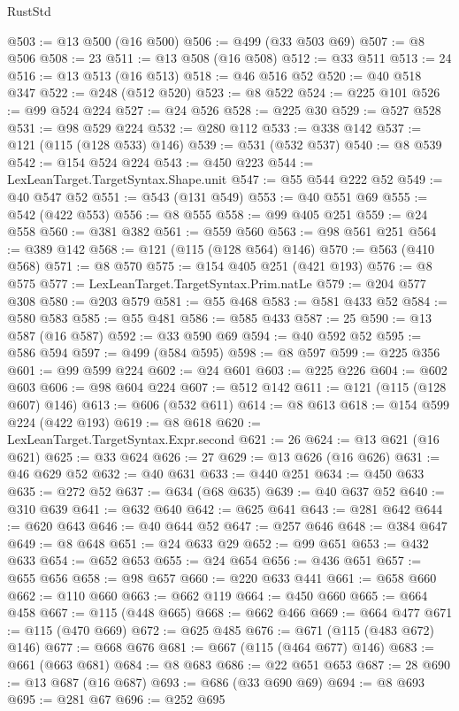 \begin{lexlean}{RustStd}
\begin{coremodule}
{\begin{coremodule}
{{{{{{{{{{{{{{{{{{{{{{{{{{{{{{{{{{{{{{@503 := @13 @500 (@16 @500)
@506 := @499 (@33 @503 @69)
@507 := @8 @506
@508 := 23
@511 := @13 @508 (@16 @508)
@512 := @33 @511
@513 := 24
@516 := @13 @513 (@16 @513)
@518 := @46 @516 @52
@520 := @40 @518 @347
@522 := @248 (@512 @520)
@523 := @8 @522
@524 := @225 @101
@526 := @99 @524 @224
@527 := @24 @526
@528 := @225 @30
@529 := @527 @528
@531 := @98 @529 @224
@532 := @280 @112
@533 := @338 @142
@537 := @121 (@115 (@128 @533) @146)
@539 := @531 (@532 @537)
@540 := @8 @539
@542 := @154 @524 @224
@543 := @450 @223
@544 := LexLeanTarget.TargetSyntax.Shape.unit
@547 := @55 @544 @222 @52
@549 := @40 @547 @52
@551 := @543 (@131 @549)
@553 := @40 @551 @69
@555 := @542 (@422 @553)
@556 := @8 @555
@558 := @99 @405 @251
@559 := @24 @558
@560 := @381 @382
@561 := @559 @560
@563 := @98 @561 @251
@564 := @389 @142
@568 := @121 (@115 (@128 @564) @146)
@570 := @563 (@410 @568)
@571 := @8 @570
@575 := @154 @405 @251 (@421 @193)
@576 := @8 @575
@577 := LexLeanTarget.TargetSyntax.Prim.natLe
@579 := @204 @577 @308
@580 := @203 @579
@581 := @55 @468
@583 := @581 @433 @52
@584 := @580 @583
@585 := @55 @481
@586 := @585 @433
@587 := 25
@590 := @13 @587 (@16 @587)
@592 := @33 @590 @69
@594 := @40 @592 @52
@595 := @586 @594
@597 := @499 (@584 @595)
@598 := @8 @597
@599 := @225 @356
@601 := @99 @599 @224
@602 := @24 @601
@603 := @225 @226
@604 := @602 @603
@606 := @98 @604 @224
@607 := @512 @142
@611 := @121 (@115 (@128 @607) @146)
@613 := @606 (@532 @611)
@614 := @8 @613
@618 := @154 @599 @224 (@422 @193)
@619 := @8 @618
@620 := LexLeanTarget.TargetSyntax.Expr.second
@621 := 26
@624 := @13 @621 (@16 @621)
@625 := @33 @624
@626 := 27
@629 := @13 @626 (@16 @626)
@631 := @46 @629 @52
@632 := @40 @631
@633 := @440 @251
@634 := @450 @633
@635 := @272 @52
@637 := @634 (@68 @635)
@639 := @40 @637 @52
@640 := @310 @639
@641 := @632 @640
@642 := @625 @641
@643 := @281 @642
@644 := @620 @643
@646 := @40 @644 @52
@647 := @257 @646
@648 := @384 @647
@649 := @8 @648
@651 := @24 @633 @29
@652 := @99 @651
@653 := @432 @633
@654 := @652 @653
@655 := @24 @654
@656 := @436 @651
@657 := @655 @656
@658 := @98 @657
@660 := @220 @633 @441
@661 := @658 @660
@662 := @110 @660
@663 := @662 @119
@664 := @450 @660
@665 := @664 @458
@667 := @115 (@448 @665)
@668 := @662 @466
@669 := @664 @477
@671 := @115 (@470 @669)
@672 := @625 @485
@676 := @671 (@115 (@483 @672) @146)
@677 := @668 @676
@681 := @667 (@115 (@464 @677) @146)
@683 := @661 (@663 @681)
@684 := @8 @683
@686 := @22 @651 @653
@687 := 28
@690 := @13 @687 (@16 @687)
@693 := @686 (@33 @690 @69)
@694 := @8 @693
@695 := @281 @67
@696 := @252 @695
}}}}}}}}}}}}}}}}}}}}}}}}}}}}}}}}}}}}}}
\end{coremodule}}
\end{coremodule}
\end{lexlean}
